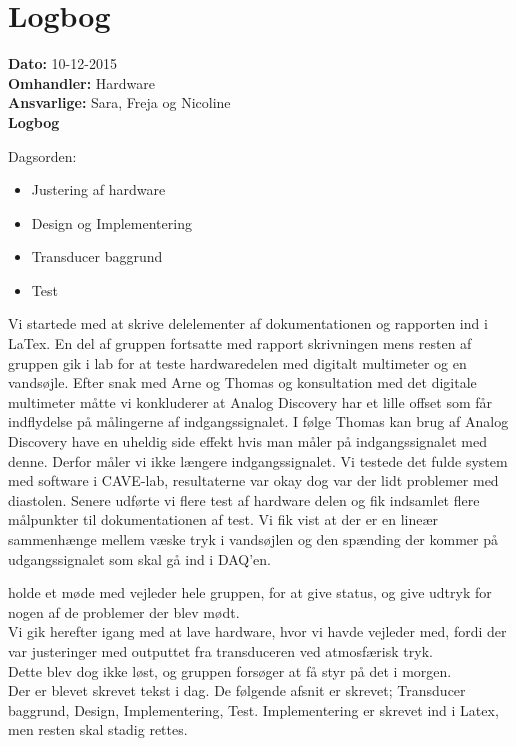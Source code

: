 \section{Logbog}

\textbf{Dato:} 10-12-2015 \\
\textbf{Omhandler:} Hardware \\
\textbf{Ansvarlige:} Sara, Freja og Nicoline \\
\textbf{Logbog}

Dagsorden:
\begin{itemize}
	\item Justering af hardware
	\item Design og Implementering
	\item Transducer baggrund
	\item Test
\end{itemize}

Vi startede med at skrive delelementer af dokumentationen og rapporten ind i LaTex. En del af gruppen fortsatte med rapport skrivningen mens resten af gruppen gik i lab for at teste hardwaredelen med digitalt multimeter og en vandsøjle. Efter snak med Arne og Thomas og konsultation med det digitale multimeter måtte vi konkluderer at Analog Discovery har et lille offset som får indflydelse på målingerne af indgangssignalet. I følge Thomas kan brug af Analog Discovery have en uheldig side effekt hvis man måler på indgangssignalet med denne. Derfor måler vi ikke længere indgangssignalet.
Vi testede det fulde system med software i CAVE-lab, resultaterne var okay dog var der lidt problemer med diastolen. 
Senere udførte vi flere test af hardware delen og fik indsamlet flere målpunkter til dokumentationen af test. Vi fik vist at der er en lineær sammenhænge mellem væske tryk i vandsøjlen og den spænding der kommer på udgangssignalet som skal gå ind i DAQ'en.  



holde et møde med vejleder hele gruppen, for at give status, og give udtryk for nogen af de problemer der blev mødt. \\
Vi gik herefter igang med at lave hardware, hvor vi havde vejleder med, fordi der var justeringer med outputtet fra transduceren ved atmosfærisk tryk. \\
Dette blev dog ikke løst, og gruppen forsøger at få styr på det i morgen.\\
Der er blevet skrevet tekst i dag. De følgende afsnit er skrevet; Transducer baggrund, Design, Implementering, Test. Implementering er skrevet ind i Latex, men resten skal stadig rettes. 